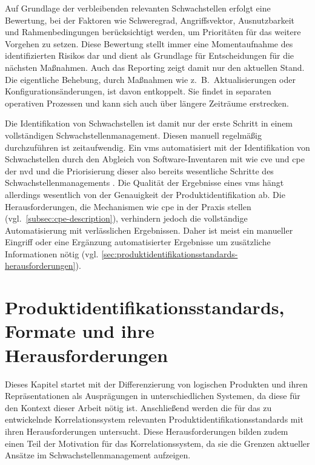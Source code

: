 Auf Grundlage der verbleibenden relevanten Schwachstellen erfolgt eine Bewertung, bei der Faktoren wie Schweregrad, Angriffsvektor, Ausnutzbarkeit und Rahmenbedingungen berücksichtigt werden, um Prioritäten für das weitere Vorgehen zu setzen.
Diese Bewertung stellt immer eine Momentaufnahme des identifizierten Risikos dar und dient als Grundlage für Entscheidungen für die nächsten Maßnahmen.
Auch das Reporting zeigt damit nur den aktuellen Stand.
Die eigentliche Behebung, durch Maßnahmen wie z.\ B.\ Aktualisierungen oder Konfigurationsänderungen, ist davon entkoppelt.
Sie findet in separaten operativen Prozessen und kann sich auch über längere Zeiträume erstrecken.

Die Identifikation von Schwachstellen ist damit nur der erste Schritt in einem vollständigen Schwachstellenmanagement.
Diesen manuell regelmäßig durchzuführen ist zeitaufwendig.
Ein \acrshort{vms} automatisiert mit der Identifikation von Schwachstellen durch den Abgleich von Software-Inventaren mit  wie \acrshort{cve} und \acrshort{cpe} der \acrshort{nvd} und die Priorisierung dieser also bereits wesentliche Schritte des Schwachstellenmanagements \autocite{Idrissi_Sebai_Faroukhi_Mahouachi_2024}.
Die Qualität der Ergebnisse eines \acrshort{vms} hängt allerdings wesentlich von der Genauigkeit der Produktidentifikation ab.
Die Herausforderungen, die Mechanismen wie \acrshort{cpe} in der Praxis stellen (vgl.\ \autoref{subsec:cpe-description}), verhindern jedoch die vollständige Automatisierung mit verlässlichen Ergebnissen.
Daher ist meist ein manueller Eingriff oder eine Ergänzung automatisierter Ergebnisse um zusätzliche Informationen nötig (vgl. \autoref{sec:produktidentifikationsstandards-herausforderungen}).


\section{Produktidentifikationsstandards, Formate und ihre Herausforderungen}\label{sec:produktidentifikationsstandards-herausforderungen}

Dieses Kapitel startet mit der Differenzierung von logischen Produkten und ihren Repräsentationen als Ausprägungen in unterschiedlichen Systemen, da diese für den Kontext dieser Arbeit nötig ist.
Anschließend werden die für das zu entwickelnde Korrelationssystem relevanten Produktidentifikationsstandards mit ihren Herausforderungen untersucht.
Diese Herausforderungen bilden zudem einen Teil der Motivation für das Korrelationssystem, da sie die Grenzen aktueller Ansätze im Schwachstellenmanagement aufzeigen.


